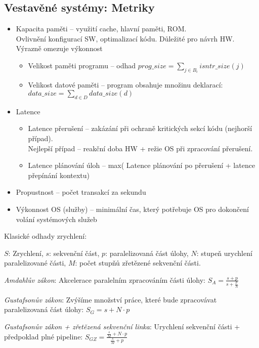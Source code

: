 \documentclass[a4paper, 11pt]{report}
\begin{document}
\subsection{Vestavěné systémy: Metriky}
\begin{itemize}
	\item Kapacita paměti -- využití cache, hlavní paměti, ROM.\\
	Ovlivnění konfigurací SW, optimalizací kódu. Důležité pro návrh HW. Výrazně omezuje výkonnost
	\begin{itemize}
		\item Velikost paměti programu -- odhad $prog\_size = \sum_{j \in B_i} isntr\_size(j)$
		\item Velikost datové paměti -- program obsahuje množinu deklarací: $data\_size = \sum_{d\in D} data\_size(d)$
	\end{itemize}
	\item Latence
	\begin{itemize}
		\item Latence přerušení -- zakázání při ochraně kritických sekcí kódu (nejhorší případ).\\
		Nejlepší případ -- reakční doba HW + režie OS při zpracování přerušení.
		\item Latence plánování úloh -- max( Latence plánování po přerušení + latence přepínání kontextu)
	\end{itemize}
	\item Propustnost -- počet transakcí za sekundu
	\item Výkonnost OS (služby) -- minimální čas, který potřebuje OS pro dokončení volání systémových služeb
\end{itemize}

Klasické odhady zrychlení:

$S$: Zrychlení, $s$: sekvenční část, $p$: paralelizovaná část úlohy, $N$: stupeň urychlení paralelizované části, $M$: počet stupňů zřetězené sekvenční části.

\emph{Amdahlův zákon}: Akcelerace paralelním zpracováním části úlohy:
$S_A = \frac{s + p}{s + \frac{p}{N}}$

\emph{Gustafsonův zákon}: Zvýšíme množství práce, které bude zpracovávat paralelizovaná část úlohy:
$S_G = s + N \cdot p$

\emph{Gustafsonův zákon + zřetězená sekvenční linka}: Urychlení sekvenční části + předpoklad plné pipeline:
$S_{GZ} = \frac{ \frac{s}{M} + N \cdot p }{ \frac{s}{M} + p}$
\end{document}
